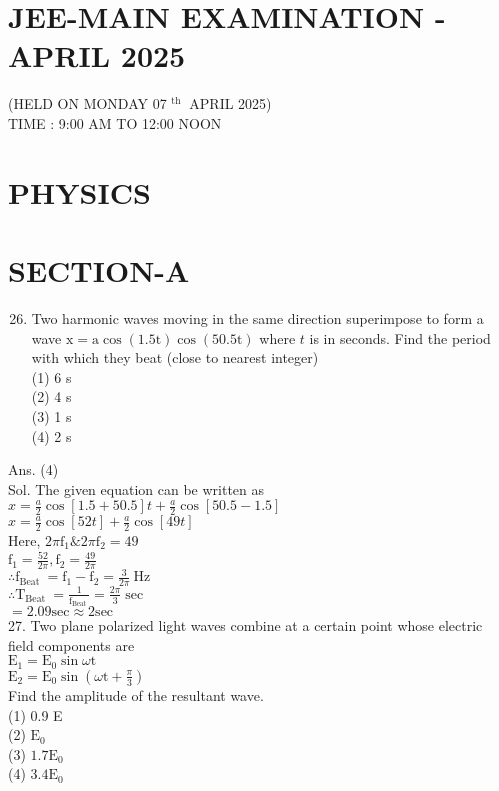\documentclass[10pt]{article}
\begin{document}
\captionsetup{singlelinecheck=false}
\section*{JEE-MAIN EXAMINATION - APRIL 2025}
(HELD ON MONDAY 07 \(^{\text {th }}\) APRIL 2025)\\
TIME : 9:00 AM TO 12:00 NOON

\section*{PHYSICS}
\section*{SECTION-A}
\begin{enumerate}
  \setcounter{enumi}{25}
  \item Two harmonic waves moving in the same direction superimpose to form a wave \(\mathrm{x}=\mathrm{a} \cos (1.5 \mathrm{t}) \cos (50.5 \mathrm{t})\) where \(t\) is in seconds. Find the period with which they beat (close to nearest integer)\\
(1) 6 s\\
(2) 4 s\\
(3) 1 s\\
(4) 2 s
\end{enumerate}

Ans. (4)\\
Sol. The given equation can be written as\\
\(x=\frac{a}{2} \cos [1.5+50.5] t+\frac{a}{2} \cos [50.5-1.5]\)\\
\(x=\frac{a}{2} \cos [52 t]+\frac{a}{2} \cos [49 t]\)\\
Here, \(2 \pi \mathrm{f}_{1} \& 2 \pi \mathrm{f}_{2}=49\)\\
\(\mathrm{f}_{1}=\frac{52}{2 \pi}, \mathrm{f}_{2}=\frac{49}{2 \pi}\)\\
\(\therefore \mathrm{f}_{\text {Beat }}=\mathrm{f}_{1}-\mathrm{f}_{2}=\frac{3}{2 \pi} \mathrm{~Hz}\)\\
\(\therefore \mathrm{T}_{\text {Beat }}=\frac{1}{\mathrm{f}_{\text {Beat }}}=\frac{2 \pi}{3} \sec\)\\
\(=2.09 \mathrm{sec} \approx 2 \mathrm{sec}\)\\
27. Two plane polarized light waves combine at a certain point whose electric field components are\\
\(\mathrm{E}_{1}=\mathrm{E}_{0} \sin \omega \mathrm{t}\)\\
\(\mathrm{E}_{2}=\mathrm{E}_{0} \sin \left(\omega \mathrm{t}+\frac{\pi}{3}\right)\)\\
Find the amplitude of the resultant wave.\\
(1) 0.9 E\\
(2) \(\mathrm{E}_{0}\)\\
(3) \(1.7 \mathrm{E}_{0}\)\\
(4) \(3.4 \mathrm{E}_{0}\)
\end{document}
